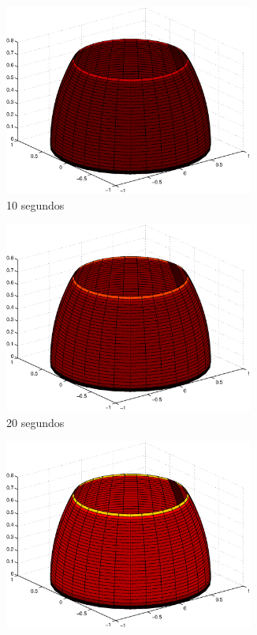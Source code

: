 \documentclass{article}
\begin{document}
		\begin{figure}
			\centering
			\begin{subfigure}[b]{0.45\textwidth}
				\includegraphics[width=0.9\textwidth]{time-10.eps}
				\caption{10 segundos}
			\end{subfigure}
			\begin{subfigure}[b]{0.45\textwidth}
				\includegraphics[width=0.9\textwidth]{time-20.eps}
				\caption{20 segundos}
			\end{subfigure}
			\begin{subfigure}[b]{0.45\textwidth}
				\includegraphics[width=0.9\textwidth]{time-30.eps}

\end{subfigure}
\end{figure}
\end{document}
